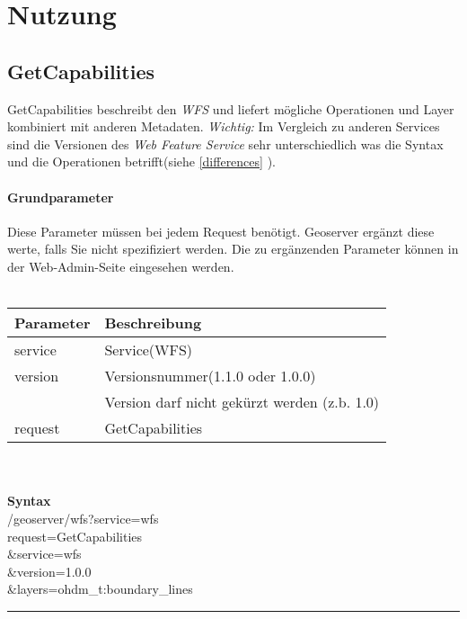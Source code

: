 \section{Nutzung}

\subsection*{GetCapabilities}

GetCapabilities beschreibt den \emph{WFS} und liefert mögliche Operationen und Layer kombiniert mit anderen Metadaten. \emph{Wichtig:} Im Vergleich zu anderen Services sind die Versionen des \emph{Web Feature Service} sehr unterschiedlich was die Syntax und die Operationen betrifft(siehe \ref{differences} ).
\vspace{1em}\\
\paragraph*{Grundparameter} Diese Parameter müssen bei jedem Request benötigt. Geoserver ergänzt diese werte, falls Sie nicht spezifiziert werden. Die zu ergänzenden Parameter können in der Web-Admin-Seite eingesehen werden.\\
\vspace{2em}\\
\begin{tabular}{ll}
\textbf{Parameter} & \textbf{Beschreibung}\\
\hline 
service  & Service(WFS) \\ 
\hline 
version  & Versionsnummer(1.1.0 oder 1.0.0) \\&Version darf nicht gekürzt werden (z.b. 1.0)\\ 
\hline 
request  & GetCapabilities \\ 
\hline 
\end{tabular}\\
\vspace{2em}\\
\textbf{Syntax}\\
/geoserver/wfs?service=wfs\\
request=GetCapabilities\\
\&service=wfs\\
\&version=1.0.0\\
\&layers=ohdm\_t:boundary\_lines\\

\hrule

